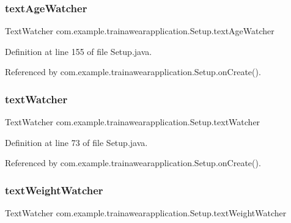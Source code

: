\subsubsection{\texorpdfstring{textAgeWatcher}{textAgeWatcher}}
{\footnotesize\ttfamily Text\+Watcher com.\+example.\+trainawearapplication.\+Setup.\+text\+Age\+Watcher\hspace{0.3cm}{\ttfamily [package]}}



Definition at line 155 of file Setup.\+java.



Referenced by com.\+example.\+trainawearapplication.\+Setup.\+on\+Create().

\mbox{\label{classcom_1_1example_1_1trainawearapplication_1_1_setup_a5aa0a607f294553110e94755d83ee3e9}} 
\subsubsection{\texorpdfstring{textWatcher}{textWatcher}}
{\footnotesize\ttfamily Text\+Watcher com.\+example.\+trainawearapplication.\+Setup.\+text\+Watcher\hspace{0.3cm}{\ttfamily [package]}}



Definition at line 73 of file Setup.\+java.



Referenced by com.\+example.\+trainawearapplication.\+Setup.\+on\+Create().

\mbox{\label{classcom_1_1example_1_1trainawearapplication_1_1_setup_a5115444305047cbe985969e5ab4c53ff}} 
\subsubsection{\texorpdfstring{textWeightWatcher}{textWeightWatcher}}
{\footnotesize\ttfamily Text\+Watcher com.\+example.\+trainawearapplication.\+Setup.\+text\+Weight\+Watcher\hspace{0.3cm}{\ttfamily [package]}}

